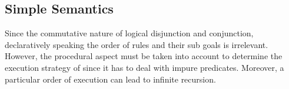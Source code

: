 \documentclass[thesis-solanki.tex]{subfiles}
\begin{document}
\begin{comment}
\subsection{Function terms}

Functions have the form \Verb!<functor>(<term>{,<term>})!
where \Verb!functor! starts with a lower-case alphabetic. 
\paragraph{Example}
\par
\begin{verbatim}
prerequisite_to(adv_ai)
grade_attained_in(prerequisite_to(adv_ai),pass)
\end{verbatim}
     
The number of arguments is the arity of the function. When referring to a functor, it is written with its arity in
the format \Verb!<functor>/<arity>!. This is also true for atoms, whose arity is 0.
Note that this is a recursive definition.
\paragraph{The view of functions as trees}
\subparagraph{Operators}
Some functors are used in infix notation, e.g., \Verb!5+4!.
Operators do not cause the associated function to be carried out.
\subparagraph{Variables}

Uppercase or `\Verb!_!' start variables.
\paragraph{Example}
\begin{verbatim}
Who
What
_special
_
\end{verbatim}
     
Variables in \progLang{Prolog} are rather different from those in most other languages. Further discussion and use is deferred until later.

\end{comment}

\subsection{Simple Semantics}

Since the commutative nature of logical disjunction and conjunction, declaratively speaking the order of rules and their sub goals is
irrelevant. However, the procedural aspect must be taken into account to determine the execution strategy of  since it
has to deal with impure predicates. Moreover, a particular order of execution can lead to infinite recursion.
\end{document}
